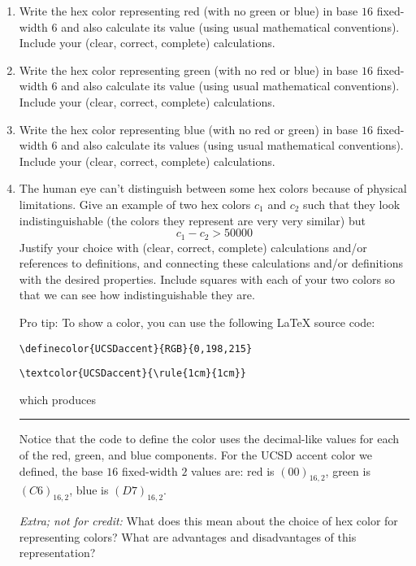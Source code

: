 \documentclass[12pt, oneside]{article}
\begin{document}
\begin{enumerate}
    \begin{enumerate}
    \item  Write the hex color representing red (with no green or blue) 
    in base $16$ fixed-width $6$ and also calculate its value 
    (using usual mathematical conventions).
    Include your (clear, correct, complete) calculations.
    \item  Write the hex color representing green (with no red or blue) 
    in base $16$ fixed-width $6$ and also calculate its value
    (using usual mathematical conventions).
    Include your (clear, correct, complete) calculations.
    \item  Write the hex color representing blue (with no red or green) 
    in base $16$ fixed-width $6$ and also calculate its values
    (using usual mathematical conventions).
    Include your (clear, correct, complete) calculations.
    \item The human eye can't distinguish between some hex colors because of 
    physical limitations. Give an example of two hex colors $c_1$ and $c_2$ such that
    they look indistinguishable (the colors they represent are very very similar) but
        \[
            c_1 - c_2 > 50000
        \]
    Justify your choice 
    with (clear, correct, complete) calculations and/or references to definitions, 
    and connecting these
    calculations and/or definitions with
    the desired properties.  Include squares with each of your two colors so 
    that we can see how indistinguishable they are. 

    Pro tip: To show a color, you can use the following LaTeX source code:
    
        \verb|\definecolor{UCSDaccent}{RGB}{0,198,215}|

        \verb|\textcolor{UCSDaccent}{\rule{1cm}{1cm}}|

    which produces 
    \textcolor{UCSDaccent}{\rule{1cm}{1cm}}

    Notice that the code to define the color uses the decimal-like values 
    for each of the red, green, and blue components. For the UCSD accent color we defined, 
    the base $16$ fixed-width $2$ values are: red is $(00)_{16,2}$, green is $(C6)_{16,2}$,
    blue is $(D7)_{16,2}$.

    {\it Extra; not for credit:} What does this mean about the choice of hex color for
    representing colors? What are advantages and disadvantages of this representation?

    \end{enumerate}


\end{enumerate}
\end{document}
